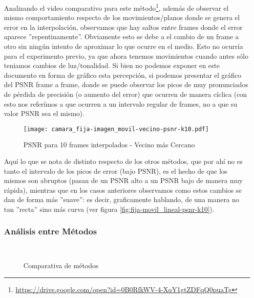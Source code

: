 \par Analizando el video comparativo para este
m\'etodo\footnote{\url{https://drive.google.com/open?id=0B0RfkWV-4-XqY1gtZDFqQ0puaTg}},
adem\'as de observar el mismo comportamiento respecto de los movimientos/planos
donde se genera el error en la interpolaci\'on, observamos que hay saltos entre
frames donde el error aparece ''repentinamente''. Obviamente esto se debe a el
cambio de un frame a otro sin ning\'un intento de aproximar lo que ocurre en el
medio. Esto no ocurr\'ia para el experimento previo, ya que ahora tenemos
movimientos cuando antes s\'olo teniamos cambios de luz/tonalidad. Si bien no
podemos exponer en este documento en forma de gr\'afico esta percepci\'on, si
podemos presentar el gr\'afico del PSNR frame a frame, donde se puede observar
los picos de muy pronunciados de p\'erdida de precisi\'on (o aumento del error)
que ocurren de manera c\'iclica (con esto nos refer\'imos a que ocurren a un
intervalo regular de frames, no a que su valor PSNR sea el mismo).

\begin{figure}
    \centering
    \texttt{[image: camara\_fija-imagen\_movil-vecino-psnr-k10.pdf]}
    \caption{PSNR para 10 frames interpolados - Vecino m\'as Cercano}
    \label{fig:fija-movil_vecino-psnr-k10}
\end{figure}

\par Aqu\'i lo que se nota de distinto respecto de los otros m\'etodos, que por
ah\'i no es tanto el intervalo de los picos de error (bajo PSNR), es el hecho
de que los mismos son abruptos (pasan de un PSNR alto a un PSNR bajo de manera
muy r\'apida), mientras que en los casos anteriores observamos como estos cambios
se dan de forma m\'as ''suave'': es decir, graficamente hablando, de una manera
no tan ''recta'' sino m\'as curva (ver figura \ref{fig:fija-movil_lineal-psnr-k10}).

\subsubsection{An\'alisis entre M\'etodos}

\begin{figure}[H]
    \centering
    \\
    \caption{Comparativa de m\'etodos}
    \label{fig:fija-movil_metodos}
\end{figure}

